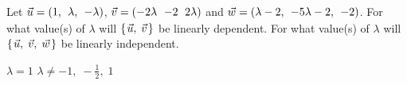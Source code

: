 
\begin{Exercise}[
name={},
title={}, 
difficulty=0,
origin={\cite{YL}}]
Let $\vec{u}=\rowvec{1,& \lambda,& -\lambda}$, $\vec{v}=\rowvec{-2\lambda& -2& 2\lambda}$ and $\vec{w}=\rowvec{\lambda-2,& -5\lambda-2,& -2}$.
\Question For what value(s) of $\lambda$ will $\mbox{$\left\{\hspace{0.1em}\vec{u},\; \vec{v}\hspace{0.1em}\right\}$}$ be linearly dependent.
\Question For what value(s) of $\lambda$ will $\mbox{$\left\{\hspace{0.1em}\vec{u},\; \vec{v},\; \vec{w}\hspace{0.1em}\right\}$}$ be linearly independent.
\end{Exercise}

\begin{Answer}
\Question $\lambda=1$
\Question $\lambda\neq-1,\;-\frac12,\;1$
\end{Answer}
